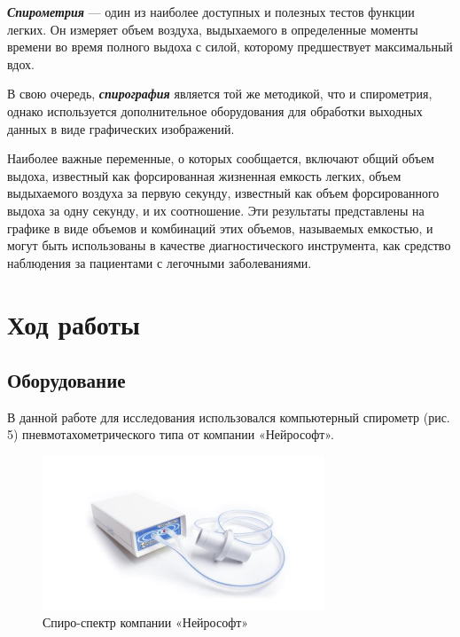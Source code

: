 \documentclass{article}
\begin{document}
            \hspace*{4mm} \textbf{\textit{Спирометрия}} — один из наиболее доступных и полезных тестов функции
            легких. Он измеряет объем воздуха, выдыхаемого в определенные моменты
            времени во время полного выдоха с силой, которому предшествует
            максимальный вдох.
            \vspace*{4mm}

            В свою очередь, \textbf{\textit{спирография}} является той же методикой, что и
            спирометрия, однако используется дополнительное оборудования для обработки
            выходных данных в виде графических изображений.
            \vspace*{4mm}

            Наиболее важные переменные, о которых сообщается, включают общий
            объем выдоха, известный как форсированная жизненная емкость легких, объем
            выдыхаемого воздуха за первую секунду, известный как объем форсированного
            выдоха за одну секунду, и их соотношение. Эти результаты представлены на
            графике в виде объемов и комбинаций этих объемов, называемых емкостью, и
            могут быть использованы в качестве диагностического инструмента, как
            средство наблюдения за пациентами с легочными заболеваниями.


    \section*{Ход работы}

        \subsection*{Оборудование}

            \hspace*{4mm} В данной работе для исследования использовался компьютерный
            спирометр (рис. 5) пневмотахометрического типа от компании «Нейрософт».

            \begin{figure}[h]
                \centering
                \includegraphics*[width=0.75\textwidth]{Спирометр.png}
                \caption{Спиро-спектр компании «Нейрософт»}
            \end{figure}
        \newpage
\end{document}
